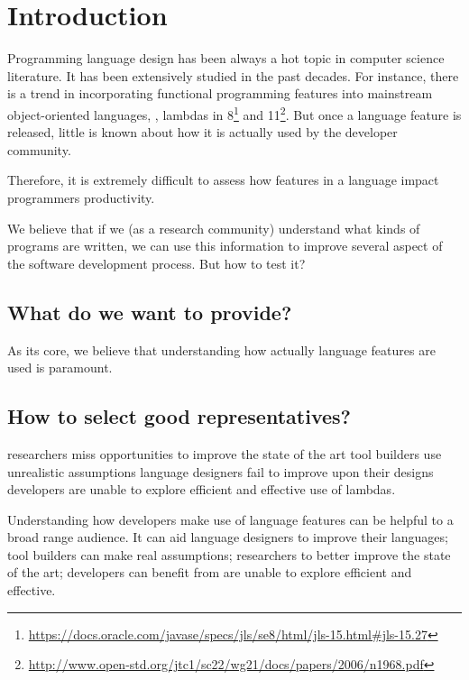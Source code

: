 

\chapter{Introduction}

Programming language design has been always a hot topic in computer science literature.
It has been extensively studied in the past decades.
For instance, there is a trend in incorporating functional programming features into mainstream object-oriented languages, \eg{}, lambdas in \java{} 8\footnote{\url{https://docs.oracle.com/javase/specs/jls/se8/html/jls-15.html\#jls-15.27}} and \cpp{}11\footnote{\url{http://www.open-std.org/jtc1/sc22/wg21/docs/papers/2006/n1968.pdf}}.
But once a language feature is released, little is known about how it is actually used by the developer community.

Therefore, it is extremely difficult to assess how features in a language impact programmers productivity.

We believe that if we (as a research community) understand what kinds of programs are written, we can use this information to improve several aspect of the software development process.
But how to test it?


\section{What do we want to provide?}

As its core, we believe that understanding how actually language features are
used is paramount.


\section{How to select good representatives?}

researchers miss opportunities to improve the state of the art
tool builders use unrealistic assumptions
language designers fail to improve upon their designs
developers are unable to explore efficient and effective use of lambdas.

Understanding how developers make use of language features can be helpful to a broad range audience.
It can aid language designers to improve their languages;
tool builders can make real assumptions;
researchers to better improve the state of the art;
developers can benefit from are unable to explore efficient and effective.

